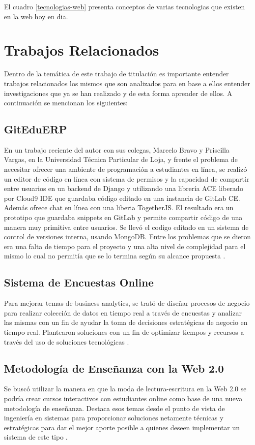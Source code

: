 El cuadro \ref{tecnologias-web} presenta conceptos de varias tecnologias que existen en la web hoy en dia.

\section{Trabajos Relacionados}
Dentro de la temática de este trabajo de titulación es importante entender trabajos relacionados los mismos que son analizados para en base a ellos entender investigaciones que ya se han realizado y de esta forma aprender de ellos. A continuación se mencionan los siguientes:

\subsection{GitEduERP}
En un trabajo reciente del autor con sus colegas, Marcelo Bravo y Priscilla Vargas, en la Universidad Técnica Particular de Loja, y frente el problema de necesitar ofrecer una ambiente de programación a estudiantes en línea, se realizó un editor de código en línea con sistema de permisos y la capacidad de compartir entre usuarios en un backend de Django y utilizando una librería ACE liberado por Cloud9 IDE que guardaba código editado en una instancia de GitLab CE. Además ofrece chat en línea con una liberia TogetherJS. El resultado era un prototipo que guardaba snippets en GitLab y permite compartir código de una manera muy primitiva entre usuarios. Se llevó el codigo editado en un sistema de control de versiones interna, usando MongoDB. Entre los problemas que se dieron era una falta de tiempo para el proyecto y una alta nivel de complejidad para el mismo lo cual no permitía que se lo termina según su alcance propuesta \citep{UTPL-GitEduERP}.

\subsection{Sistema de Encuestas Online}
Para mejorar temas de business analytics, se trató de diseñar procesos de negocio para realizar colección de datos en tiempo real a través de encuestas y analizar las mismas con un fin de ayudar la toma de decisiones estratégicas de negocio en tiempo real. Plantearon soluciones con un fin de optimizar tiempos y recursos a través del uso de soluciones tecnológicas \citep{UTPL-Thesis-Encuestas-Online}.

\subsection{Metodología de Enseñanza con la Web 2.0}
Se buscó utilizar la manera en que la moda de lectura-escritura en la Web 2.0 se podría crear cursos interactivos con estudiantes online como base de una nueva metodología de enseñanza. Destaca esos temas desde el punto de vista de ingeniería en sistemas para proporcionar soluciones netamente técnicas y estratégicas para dar el mejor aporte posible a quienes deseen implementar un sistema de este tipo \citep{UTPL-Thesis-Edu-Web-2}.

